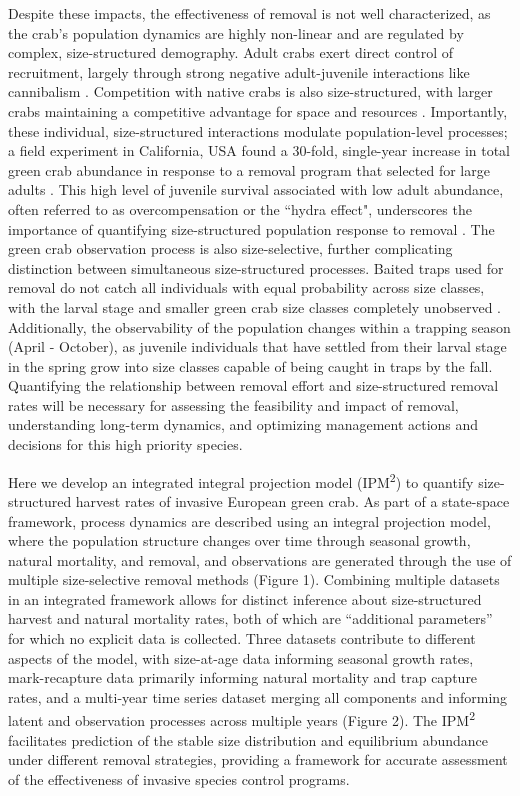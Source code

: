 \documentclass{article}
\begin{document}
Despite these impacts, the effectiveness of removal is not well characterized, as the crab’s population dynamics are highly non-linear and are regulated by complex, size-structured demography. Adult crabs exert direct control of recruitment, largely through strong negative adult-juvenile interactions like cannibalism
\parencite{grosholz2021stage, romano2017cannibalism}. Competition with native crabs is also size-structured, with larger crabs maintaining a competitive advantage for space and resources \parencite{mcdonald2001competitive, jensen2007biotic}. Importantly, these individual, size-structured interactions modulate population-level processes; a field experiment in California, USA found a 30-fold, single-year increase in total green crab abundance in response to a removal program that selected for large adults \parencite{grosholz2021stage}. This high level of juvenile survival associated with low adult abundance, often referred to as overcompensation or the ``hydra effect", underscores the importance of quantifying size-structured population response to removal \parencite{abrams2009does}. The green crab observation process is also size-selective, further complicating distinction between simultaneous size-structured processes. Baited traps used for removal do not catch all individuals with equal probability across size classes, with the larval stage and smaller green crab size classes completely unobserved \parencite{jorgensen2009size}. Additionally, the observability of the population changes within a trapping season (April - October), as juvenile individuals that have settled from their larval stage in the spring grow into size classes capable of being caught in traps by the fall. Quantifying the relationship between removal effort and size-structured removal rates will be necessary for assessing the feasibility and impact of removal, understanding long-term dynamics, and optimizing management actions and decisions for this high priority species. 

Here we develop an integrated integral projection model (IPM\textsuperscript{2}) to quantify size-structured harvest rates of invasive European green crab. As part of a state-space framework, process dynamics are described using an integral projection model, where the population structure changes over time through seasonal growth, natural mortality, and removal, and observations are generated through the use of multiple size-selective removal methods (Figure 1). Combining multiple datasets in an integrated framework allows for distinct inference about size-structured harvest and natural mortality rates, both of which are “additional parameters” for which no explicit data is collected. Three datasets contribute to different aspects of the model, with size-at-age data informing seasonal growth rates, mark-recapture data primarily informing natural mortality and trap capture rates, and a multi-year time series dataset merging all components and informing latent and observation processes across multiple years (Figure 2). The IPM\textsuperscript{2} facilitates prediction of the stable size distribution and equilibrium abundance under different removal strategies, providing a framework for accurate assessment of the effectiveness of invasive species control programs.
\end{document}
